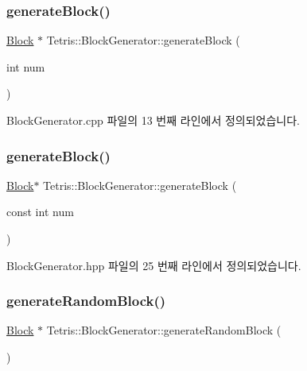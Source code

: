\subsubsection{\texorpdfstring{generate\+Block()}{generateBlock()}\hspace{0.1cm}{\footnotesize\ttfamily [1/2]}}
{\footnotesize\ttfamily \hyperlink{class_tetris_1_1_block}{Block} $\ast$ Tetris\+::\+Block\+Generator\+::generate\+Block (\begin{DoxyParamCaption}\item[{int}]{num }\end{DoxyParamCaption})}



Block\+Generator.\+cpp 파일의 13 번째 라인에서 정의되었습니다.

\mbox{\label{class_tetris_1_1_block_generator_a584fde2bfe1cdd4505bd905befd73d21}} 
\subsubsection{\texorpdfstring{generate\+Block()}{generateBlock()}\hspace{0.1cm}{\footnotesize\ttfamily [2/2]}}
{\footnotesize\ttfamily \hyperlink{class_tetris_1_1_block}{Block}$\ast$ Tetris\+::\+Block\+Generator\+::generate\+Block (\begin{DoxyParamCaption}\item[{const int}]{num }\end{DoxyParamCaption})\hspace{0.3cm}{\ttfamily [inline]}}



Block\+Generator.\+hpp 파일의 25 번째 라인에서 정의되었습니다.

\mbox{\label{class_tetris_1_1_block_generator_a10dfe1467d40437ad41c5ae76437ad78}} 
\subsubsection{\texorpdfstring{generate\+Random\+Block()}{generateRandomBlock()}\hspace{0.1cm}{\footnotesize\ttfamily [1/2]}}
{\footnotesize\ttfamily \hyperlink{class_tetris_1_1_block}{Block} $\ast$ Tetris\+::\+Block\+Generator\+::generate\+Random\+Block (\begin{DoxyParamCaption}{ }\end{DoxyParamCaption})}



